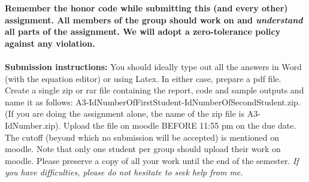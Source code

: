 \documentclass[11pt]{article}
\begin{document}
\maketitle

\textbf{Remember the honor code while submitting this (and every other) assignment. All members of the group should work on and \emph{understand} all parts of the assignment. We will adopt a \textbf{zero-tolerance policy} against any violation.}
\\
\\
\textbf{Submission instructions:} You should ideally type out all the answers in Word (with the equation editor) or using Latex. In either case, prepare a pdf file. Create a single zip or rar file containing the report, code and sample outputs and name it as follows: A3-IdNumberOfFirstStudent-IdNumberOfSecondStudent.zip. (If you are doing the assignment alone, the name of the zip file is A3-IdNumber.zip). Upload the file on moodle BEFORE 11:55 pm on the due date. The cutoff (beyond which no submission will be accepted) is mentioned on moodle. Note that only one student per group should upload their work on moodle. Please preserve a copy of all your work until the end of the semester. \emph{If you have difficulties, please do not hesitate to seek help from me.} 
\end{document}
